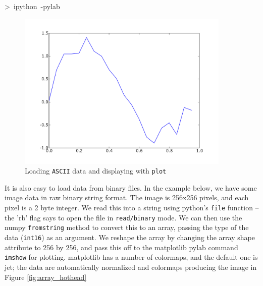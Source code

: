 \begin{lyxcode}
>~ipython~-pylab

%
\begin{figure}
\begin{centering}
\includegraphics[width=4in]{fig/load_ascii}
\par\end{centering}

\caption{\label{fig:load_ascii}Loading \texttt{ASCII} data and displaying
with \texttt{plot}}

\end{figure}

\end{lyxcode}




It is also easy to load data from binary files. In the example below,
we have some image data in raw binary string format. The image is
256x256 pixels, and each pixel is a 2 byte integer. We read this into
a string using python's \texttt{file} function -- the 'rb' flag says
to open the file in \texttt{read/binary} mode. We can then use the
numpy \texttt{fromstring} method to convert this to an array, passing
the type of the data (\texttt{int16}) as an argument. We reshape the
array by changing the array shape attribute to 256 by 256, and pass
this off to the matplotlib pylab command \texttt{imshow} for plotting.
matplotlib has a number of colormaps, and the default one is jet;
the data are automatically normalized and colormaps producing the
image in Figure \ref{fig:array_hothead}





